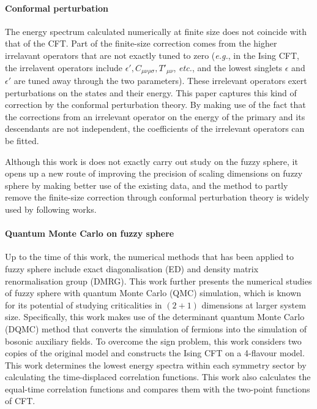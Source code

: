 \documentclass{timesjhep}
\begin{document}
\paragraph{Conformal perturbation~\cite{Lao2023}}

The energy spectrum calculated numerically at finite size does not coincide with that of the CFT. Part of the finite-size correction comes from the higher irrelavant operators that are not exactly tuned to zero (\textit{e.g.}, in the Ising CFT, the irrelavent operators include $\epsilon', C_{\mu\nu\rho\sigma}, T'_{\mu\nu}$, \textit{etc.}, and the lowest singlets $\epsilon$ and $\epsilon'$ are tuned away through the two parameters). These irrelevant operators exert perturbations on the states and their energy. This paper captures this kind of correction by the conformal perturbation theory. By making use of the fact that the corrections from an irrelevant operator on the energy of the primary and its descendants are not independent, the coefficients of the irrelevant operators can be fitted. 

Although this work is does not exactly carry out study on the fuzzy sphere, it opens up a new route of improving the precision of scaling dimensions on fuzzy sphere by making better use of the existing data, and the method to partly remove the finite-size correction through conformal perturbation theory is widely used by following works. 

\paragraph{Quantum Monte Carlo on fuzzy sphere~\cite{Hofmann2023}}

Up to the time of this work, the numerical methods that has been applied to fuzzy sphere include exact diagonalisation (ED) and density matrix renormalisation group (DMRG). This work further presents the numerical studies of fuzzy sphere with quantum Monte Carlo (QMC) simulation, which is known for its potential of studying criticalities in $(2+1)$ dimensions at larger system size. Specifically, this work makes use of the determinant quantum Monte Carlo (DQMC) method that converts the simulation of fermions into the simulation of bosonic auxiliary fields. To overcome the sign problem, this work considers two copies of the original model and constructs the Ising CFT on a 4-flavour model. This work determines the lowest energy spectra within each symmetry sector by calculating the time-displaced correlation functions. This work also calculates the equal-time correlation functions and compares them with the two-point functions of CFT. 
\end{document}
